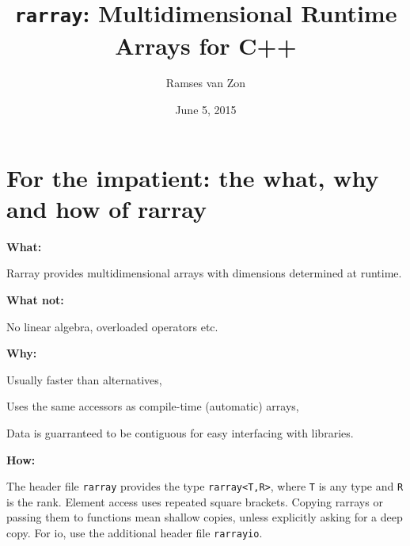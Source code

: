 \documentclass[11pt,twoside]{article}
\newcommand{\cxx}{C{++}}
\begin{document}
\setlength{\parskip}{1mm}

\title{\texttt{rarray}: Multidimensional Runtime Arrays for \cxx}

\author{Ramses van Zon%
\vspace{-8pt}} 

\date{June 5, 2015\vspace{-7mm}}

\maketitle

\section{For the impatient: the what, why and how of rarray}

\noindent\textbf{What:}

Rarray provides multidimensional arrays with dimensions determined at runtime. 

\noindent\textbf{What not:} 

No linear algebra, overloaded operators etc.

\noindent\textbf{Why:} 

Usually faster than alternatives,

Uses the same accessors as compile-time (automatic) arrays,

Data is guarranteed to be contiguous for easy interfacing with libraries.

\noindent\textbf{How:}

The header file \texttt{rarray} provides the type \texttt{rarray<T,R>}, where \texttt{T} is any type and {\tt R} is the rank. Element access uses repeated square brackets. Copying rarrays or passing them to functions mean shallow copies, unless explicitly asking for a deep copy. For io, use the additional header file \texttt{rarrayio}.

\
\end{document}
